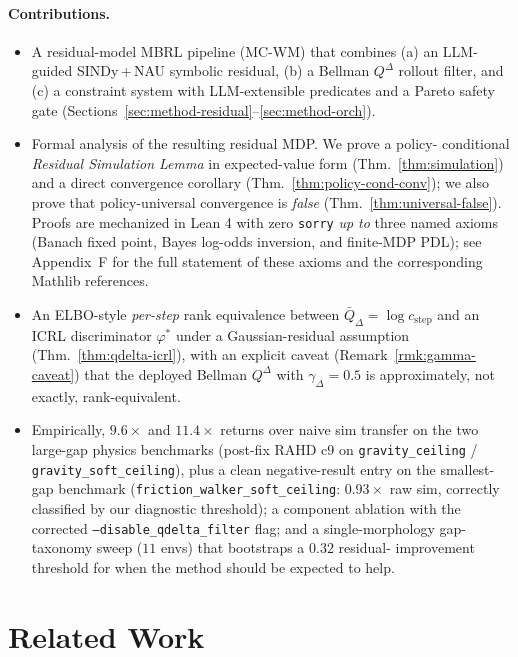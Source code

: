 \documentclass{article}
\theoremstyle{definition}
\newcommand{\QD}{Q^{\Delta}}
\begin{document}
\paragraph{Contributions.}
\begin{itemize}
\item A residual-model MBRL pipeline (MC-WM) that combines (a) an
LLM-guided SINDy\,+\,NAU symbolic residual, (b) a Bellman $\QD$ rollout
filter, and (c) a constraint system with LLM-extensible predicates and a
Pareto safety gate (Sections~\ref{sec:method-residual}--\ref{sec:method-orch}).
\item Formal analysis of the resulting residual MDP.  We prove a policy-
conditional \emph{Residual Simulation Lemma} in expected-value form
(Thm.~\ref{thm:simulation}) and a direct convergence corollary
(Thm.~\ref{thm:policy-cond-conv}); we also prove that policy-universal
convergence is \emph{false} (Thm.~\ref{thm:universal-false}).  Proofs are
mechanized in Lean 4 with zero \texttt{sorry} \emph{up to} three named
axioms (Banach fixed point, Bayes log-odds inversion, and finite-MDP
PDL); see Appendix~F for the full statement of these axioms and the
corresponding Mathlib references.
\item An ELBO-style \emph{per-step} rank equivalence between
$\bar Q_\Delta=\log c_{\mathrm{step}}$ and an ICRL discriminator
$\varphi^*$ under a Gaussian-residual assumption
(Thm.~\ref{thm:qdelta-icrl}), with an explicit caveat
(Remark~\ref{rmk:gamma-caveat}) that the deployed Bellman $\QD$ with
$\gamma_\Delta=0.5$ is approximately, not exactly, rank-equivalent.
\item Empirically, $9.6\times$ and $11.4\times$ returns over naive
sim transfer on the two large-gap physics benchmarks
(post-fix RAHD c9 on \texttt{gravity\_ceiling} / \texttt{gravity\_soft\_ceiling}),
plus a clean negative-result entry on the smallest-gap benchmark
(\texttt{friction\_walker\_soft\_ceiling}: $0.93\times$ raw sim,
correctly classified by our diagnostic threshold);
a component ablation with the corrected
\texttt{--disable\_qdelta\_filter} flag; and a single-morphology
gap-taxonomy sweep ($11$ envs) that bootstraps a $0.32$ residual-
improvement threshold for when the method should be expected to help.
\end{itemize}

\section{Related Work}
\label{sec:related}
\end{document}
